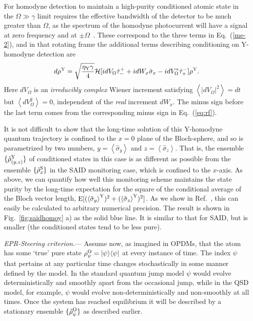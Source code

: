 \documentclass[12pt,prl,floatfix,showpacs,superscriptaddress,amsmath,amssymb]{revtex4}
\newcommand{\beq}{\begin{equation}}
\newcommand{\eeq}{\end{equation}}
\newcommand{\erf}[1]{Eq.~(\ref{#1})}
\newcommand{\bra}[1]{\langle{#1}|}
\newcommand{\ket}[1]{|{#1}\rangle}
\newcommand{\op}[2]{\hat \tau_{#1}^{#2}}
\renewcommand{\(}{\left(}
\renewcommand{\)}{\right)}
\newcommand{\an}[1]{\left\langle{#1}\right\rangle}
\renewcommand{\d}{^{\rm Y}}
\newcommand{\p}{^{\rm S}}
\newcommand{\ob}{^{\rm O}}
\newcommand{\s}[1]{\hat \sigma_{#1}}
\renewcommand{\section}[1]{{\em #1}.---}
\begin{document}
For homodyne detection to maintain a high-purity conditioned atomic state in the $\Omega \gg \gamma$ limit requires the effective bandwidth \cite{WisMil10} of the detector to be much greater than $\Omega$, as the spectrum of the homodyne photocurrent will have a signal at zero frequency and at $\pm \Omega$~\cite{WisMil93c}.
These correspond to the three terms in \erf{me-2}, and in that rotating frame the additional terms describing conditioning on Y-homodyne detection are 
\beq
d\rho\d = \sqrt{\frac{\eta_{\rm Y}\gamma}{4}}{\cal H}[ idV_\Omega \op-+  + idW_x\s{x} - i dV_\Omega^* \op+- ] \rho\d . \label{me-2}
\eeq
Here $dV_\Omega$ is an  {\em irreducibly complex} Wiener increment satisfying $\an{|dV_\Omega|^2}=dt$ but $\an{dV_\Omega^2}=0$, independent of the {\em real} increment $dW_x$. The minus sign before the last term comes from the corresponding minus sign in \erf{eq:rf}.

It is not difficult to show that the long-time solution of this Y-homodyne quantum trajectory is confined to the $x=0$ plane of the Bloch-sphere, and so is parametrized by two numbers, $y=\an{\s{y}}$ and $z=\an{\s{z}}$. That is, the ensemble $\{\tilde\rho\d_{(y,z)}\}$ of conditioned states 
in this case is as different as possible from the ensemble $\{\tilde\rho\p_x\}$ in the SAID monitoring case, which  is  confined to the $x$-axis. As above, we can quantify how well this monitoring scheme maintains the state purity by the long-time expectation for the square of the conditional average of the Bloch vector length, ${\rm E}[(\an{\s{y}}\d)^2 + (\an{\s{z}}\d)^2]$. As we show in Ref.~\cite{epaps}, this can easily 
be calculated to arbitrary numerical precision.  The result is shown in Fig.~\ref{fig:saidhomoy} a) as the solid blue line. It is similar to that for SAID, but is smaller (the conditioned states tend to be less pure). 

\section{EPR-Steering criterion} 
Assume now, as imagined in OPDMs, that the atom has some `true' pure state 
$\rho\ob_\psi = \ket{\psi}\bra{\psi}$ at every instance of time. The index 
$\psi$ that pertains at any particular time changes stochastically in some manner 
defined by the model.   In the standard quantum jump model  $\psi$ 
would  evolve deterministically and smoothly apart from the occasional jump, while in the QSD model, 
for example, $\psi$ would evolve non-deterministically and non-smoothly 
at all times.  
Once the system has reached equilibrium it will be described by a stationary ensemble $\{\tilde\rho\ob_\psi  \}$ 
as described earlier. 
\end{document}
